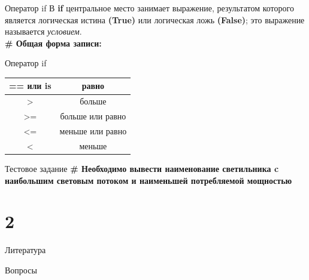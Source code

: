 \documentclass[12pt]{beamer}
\begin{document}
\begin{frame}{Оператор if}
В \textbf{if} центральное место занимает выражение, результатом которого является логическая истина \textbf{(True)} или логическая ложь \textbf{(False)}; это выражение называется \textit{условием}.\\
\vspace{0.5cm}
\textbf{\# Общая форма записи:}
\vspace{0.5cm}

\vspace{0.5cm}
\end{frame}


\begin{frame}{Оператор if}
\begin{tabular}{|c|c|}
\hline 
== или \textbf{is} & равно \\ 
\hline 
> & больше \\ 
\hline 
>= & больше или равно \\ 
\hline 
<= & меньше или равно \\ 
\hline 
< & меньше \\ 
\hline 
\end{tabular} 
\par
\vspace{0.5cm}

\end{frame}


\begin{frame}{Тестовое задание}
\textbf{\# Необходимо вывести наименование светильника c наибольшим световым потоком и наименьшей потребляемой мощностью} 
\vspace{0.5cm}

\vspace{0.5cm}
\end{frame}


\part{2}

\begin{frame}[t]{Литература}

\end{frame}

\begin{frame}[t]{Вопросы}
\vspace{0.7cm}
 \\
\end{frame}
\end{document}
